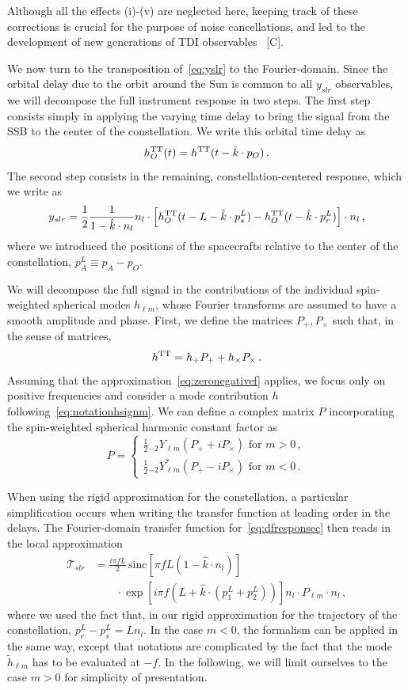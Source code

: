 \documentclass[aps,showpacs,twocolumn,
prd,superscriptaddress,nofootinbib]{revtex4-1}
\newcommand{\be}{\begin{equation}}
\newcommand{\ee}{\end{equation}}
\newcommand\calT{{\mathcal{T}}}
\newcommand{\nn}{\nonumber}
\newcommand{\sinc}{\,\mathrm{sinc}}
\newcommand{\SM}[1]{{\color{Red} #1}}
\begin{document}
Although all the effects (i)-(v) are neglected here, keeping track of these corrections is crucial for the purpose of noise cancellations, and led to the development of new generations of TDI observables~\cite{} \SM{[C]}.

We now turn to the transposition of~\eqref{eq:yslr} to the Fourier-domain. Since the orbital delay due to the orbit around the Sun is common to all $y_{slr}$ observables, we will decompose the full instrument response in two steps. The first step consists simply in applying the varying time delay to bring the signal from the SSB to the center of the constellation. We write this orbital time delay as
\be\label{eq:defresponseO}
	h^{\rm TT}_{O} (t) = h^{\rm TT}(t-\hat{k}\cdot p_{O}) \,.
\ee
The second step consists in the remaining, constellation-centered response, which we write as
\be\label{eq:dfresponsec}
	y_{slr} = \frac{1}{2} \frac{1}{1 - \hat{k}\cdot n_{l}} n_{l}\cdot \left[ h_{O}^{\rm TT}(t - L - \hat{k}\cdot p^{L}_{s}) - h_{O}^{\rm TT}(t - \hat{k}\cdot p^{L}_{r}) \right] \cdot n_{l}\,,
\ee
where we introduced the positions of the spacecrafts relative to the center of the constellation, $p^{L}_{A} \equiv p_{A} - p_{O}$.

We will decompose the full signal in the contributions of the individual spin-weighted spherical modes $h_{\ell m}$, whose Fourier transforms are assumed to have a smooth amplitude and phase. First, we define the matrices $P_{+},P_{\times}$ such that, in the sense of matrices,
\be
	h^{\rm TT} = h_{+}P_{+} + h_{\times}P_{\times} \,.
\ee
Assuming that the approximation~\eqref{eq:zeronegativef} applies, we focus only on positive frequencies and consider a mode contribution $h$ following~\eqref{eq:notationhsignm}. We can define a complex matrix $P$ incorporating the spin-weighted spherical harmonic constant factor as
\be
	P = 
	\begin{cases} 
	\frac{1}{2} {}_{-2}Y_{\ell m} \left( P_{+} + i P_{\times} \right) \text{ for } m>0\,,\\
	\frac{1}{2} {}_{-2}Y_{\ell m}^{*} \left( P_{+} - i P_{\times} \right) \text{ for } m<0\,.
	\end{cases}
\ee

When using the rigid approximation for the constellation, a particular simplification occurs when writing the transfer function at leading order in the delays. The Fourier-domain transfer function for~\eqref{eq:dfresponsec} then reads in the local approximation
\begin{align}
	\calT_{slr} &= \frac{i \pi f L}{2} \sinc \left[ \pi f L\left(1-\hat{k}\cdot n_{l} \right) \right] \nn\\
	& \qquad \cdot \exp\left[ i \pi f \left( L + \hat{k}\cdot \left( p_{1}^{L} + p_{2}^{L} \right) \right) \right]  n_{l} \cdot P_{\ell m} \cdot n_{l} \,,
\end{align}
where we used the fact that, in our rigid approximation for the trajectory of the constellation, $p^{L}_{r} - p^{L}_{s} =  L n_{l}$. In the case $m<0$, the formalism can be applied in the same way, except that notations are complicated by the fact that the mode $\tilde{h}_{\ell m}$ has to be evaluated at $-f$. In the following, we will limit ourselves to the case $m>0$ for simplicity of presentation.
\end{document}
